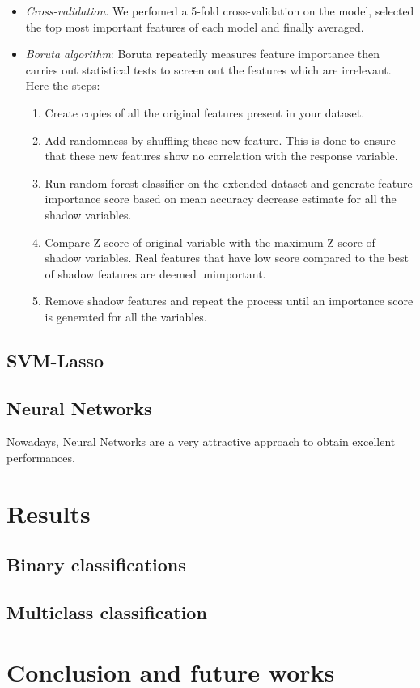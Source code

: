 \documentclass[a4paper,11pt, oneside]{article}  %
\begin{document}
\begin{itemize}
	\item \textit{Cross-validation}. We perfomed a 5-fold cross-validation on the model, selected the top most important features of each model and finally averaged.
	\item \textit{Boruta algorithm}: Boruta repeatedly measures feature importance then carries out statistical tests to screen out the features which are irrelevant. Here the steps:
	\begin{enumerate}
	\item Create copies of all the original features present in your dataset.
	\item Add randomness by shuffling these new feature. This is done to ensure that these new features show no correlation with the response variable.
	\item Run random forest classifier on the extended dataset and generate feature importance score based on mean accuracy decrease estimate for all the shadow variables.
	\item Compare Z-score of original variable with the maximum Z-score of shadow variables. Real features that have low score compared to the best of shadow features are deemed unimportant.
	\item Remove shadow features and repeat the process until an importance score is generated for all the variables.
	\end{enumerate}
\end{itemize}


\subsection{SVM-Lasso}

\subsection{Neural Networks}
Nowadays, Neural Networks are a very attractive approach to obtain excellent performances.



\section{Results}
\subsection{Binary classifications}





\subsection{Multiclass classification}


\section{Conclusion and future works}


\end{document}
